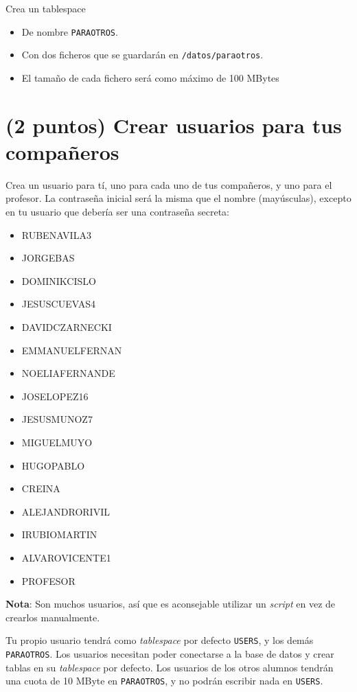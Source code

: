 \documentclass[a4paper]{article}
\begin{document}
Crea un tablespace
\begin{itemize}
\item De nombre \texttt{PARAOTROS}.
\item Con dos ficheros que se guardarán en \texttt{/datos/paraotros}.
\item El tamaño de cada fichero será como máximo de 100 MBytes
\end{itemize}

\section{(2 puntos) Crear usuarios para tus compañeros}
\label{sec:org0000006}

Crea un usuario para tí, uno para cada uno de tus compañeros, y uno para el profesor. La contraseña inicial será la misma que el nombre (mayúsculas), excepto en tu usuario que debería ser una contraseña secreta:
\begin{multicols}{3}
\begin{itemize}
\item RUBENAVILA3
\item JORGEBAS
\item DOMINIKCISLO
\item JESUSCUEVAS4
\item DAVIDCZARNECKI
\item EMMANUELFERNAN
\item NOELIAFERNANDE
\item JOSELOPEZ16
\item JESUSMUNOZ7
\item MIGUELMUYO
\item HUGOPABLO
\item CREINA
\item ALEJANDRORIVIL
\item IRUBIOMARTIN
\item ALVAROVICENTE1
\item PROFESOR
\end{itemize}
\end{multicols}
\textbf{Nota}: Son muchos usuarios, así que es aconsejable utilizar un \emph{script} en vez de crearlos manualmente.

Tu propio usuario tendrá como \emph{tablespace} por defecto \texttt{USERS}, y los demás \texttt{PARAOTROS}. Los usuarios necesitan poder conectarse a la base de datos y crear tablas en su \emph{tablespace} por defecto. Los usuarios de los otros alumnos tendrán una cuota de 10 MByte en \texttt{PARAOTROS}, y no podrán escribir nada en \texttt{USERS}.
\end{document}
